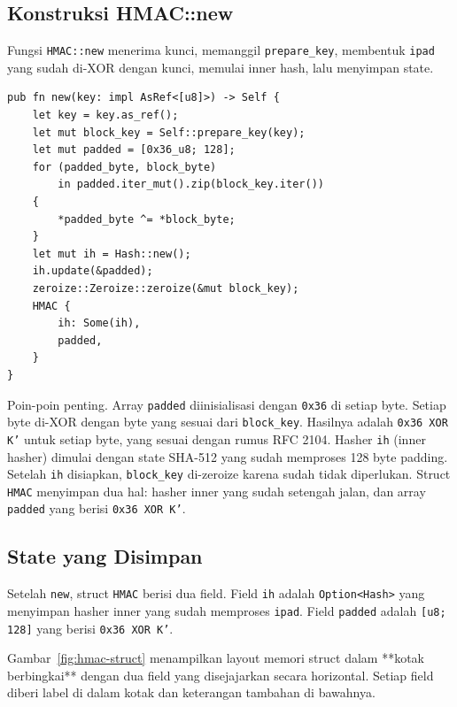 \documentclass[11pt,a4paper]{article}
\begin{document}
\subsection{Konstruksi HMAC::new}

Fungsi \texttt{HMAC::new} menerima kunci, memanggil \texttt{prepare\_key}, membentuk \texttt{ipad} yang sudah di-XOR dengan kunci, memulai inner hash, lalu menyimpan state.

\begin{lstlisting}[style=code]
pub fn new(key: impl AsRef<[u8]>) -> Self {
    let key = key.as_ref();
    let mut block_key = Self::prepare_key(key);
    let mut padded = [0x36_u8; 128];
    for (padded_byte, block_byte)
        in padded.iter_mut().zip(block_key.iter())
    {
        *padded_byte ^= *block_byte;
    }
    let mut ih = Hash::new();
    ih.update(&padded);
    zeroize::Zeroize::zeroize(&mut block_key);
    HMAC {
        ih: Some(ih),
        padded,
    }
}
\end{lstlisting}

Poin-poin penting. Array \texttt{padded} diinisialisasi dengan \texttt{0x36} di setiap byte. Setiap byte di-XOR dengan byte yang sesuai dari \texttt{block\_key}. Hasilnya adalah \texttt{0x36 XOR K'} untuk setiap byte, yang sesuai dengan rumus RFC 2104. Hasher \texttt{ih} (inner hasher) dimulai dengan state SHA-512 yang sudah memproses 128 byte padding. Setelah \texttt{ih} disiapkan, \texttt{block\_key} di-zeroize karena sudah tidak diperlukan. Struct \texttt{HMAC} menyimpan dua hal: hasher inner yang sudah setengah jalan, dan array \texttt{padded} yang berisi \texttt{0x36 XOR K'}.

\subsection{State yang Disimpan}

Setelah \texttt{new}, struct \texttt{HMAC} berisi dua field. Field \texttt{ih} adalah \texttt{Option<Hash>} yang menyimpan hasher inner yang sudah memproses \texttt{ipad}. Field \texttt{padded} adalah \texttt{[u8; 128]} yang berisi \texttt{0x36 XOR K'}.

Gambar~\ref{fig:hmac-struct} menampilkan layout memori struct dalam **kotak berbingkai** dengan dua field yang disejajarkan secara horizontal. Setiap field diberi label di dalam kotak dan keterangan tambahan di bawahnya.
\end{document}
